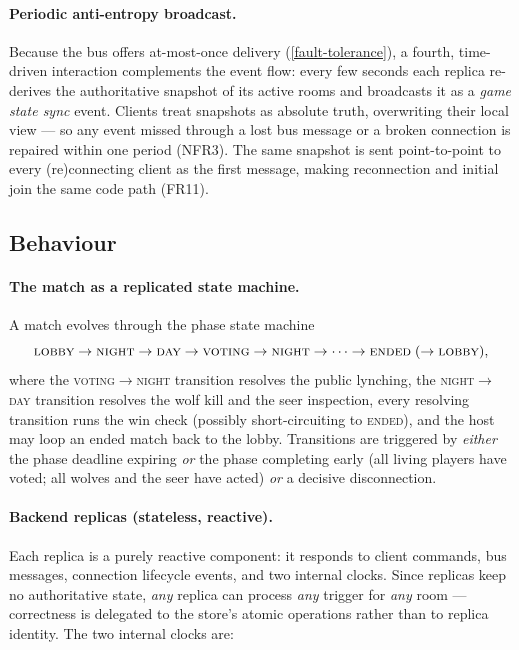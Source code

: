 \documentclass{scrartcl}
\begin{document}
\paragraph{Periodic anti-entropy broadcast.}
Because the bus offers at-most-once delivery (\cref{fault-tolerance}), a
fourth, time-driven interaction complements the event flow: every few
seconds each replica re-derives the authoritative snapshot of its active
rooms and broadcasts it as a \emph{game state sync} event. Clients treat
snapshots as absolute truth, overwriting their local view --- so any event
missed through a lost bus message or a broken connection is repaired within
one period (NFR3). The same snapshot is sent point-to-point to every
(re)connecting client as the first message, making reconnection and initial
join the same code path (FR11).

\subsection{Behaviour}\label{behaviour}

\paragraph{The match as a replicated state machine.}
A match evolves through the phase state machine
\[
\textsc{lobby} \rightarrow \textsc{night} \rightarrow \textsc{day}
\rightarrow \textsc{voting} \rightarrow \textsc{night} \rightarrow \cdots
\rightarrow \textsc{ended} \; (\rightarrow \textsc{lobby}),
\]
where the \textsc{voting}$\to$\textsc{night} transition resolves the public
lynching, the \textsc{night}$\to$\textsc{day} transition resolves the wolf
kill and the seer inspection, every resolving transition runs the win check
(possibly short-circuiting to \textsc{ended}), and the host may loop an
ended match back to the lobby. Transitions are triggered by \emph{either}
the phase deadline expiring \emph{or} the phase completing early (all
living players have voted; all wolves and the seer have acted) \emph{or} a
decisive disconnection.

\paragraph{Backend replicas (stateless, reactive).}
Each replica is a purely reactive component: it responds to client
commands, bus messages, connection lifecycle events, and two internal
clocks. Since replicas keep no authoritative state, \emph{any} replica can
process \emph{any} trigger for \emph{any} room --- correctness is delegated
to the store's atomic operations rather than to replica identity. The two
internal clocks are:
\end{document}
